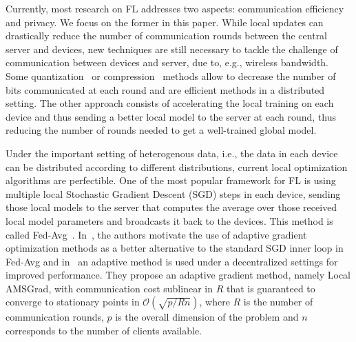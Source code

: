 \documentclass[twoside]{article}
\begin{document}
Currently, most research on FL addresses two aspects: communication efficiency and privacy.
We focus on the former in this paper.
While local updates can drastically reduce the number of communication rounds between the central server and devices, new techniques are still necessary to tackle the challenge of communication between devices and server, due to, e.g., wireless bandwidth.
Some quantization~\citep{alistarh2017qsgd, wangni2018gradient} or compression~\citep{lin2017deep} methods allow to decrease the number of bits communicated at each round and are efficient methods in a distributed setting.
The other approach consists of accelerating the local training on each device and thus sending a better local model to the server at each round, thus reducing the number of rounds needed to get a well-trained global model.

Under the important setting of heterogenous data, i.e., the data in each device can be distributed according to different distributions, current local optimization algorithms are perfectible.
One of the most popular framework for FL is using multiple local Stochastic Gradient Descent (SGD) steps in each device, sending those local models to the server that computes the average over those received local model parameters and broadcasts it back to the devices. This method is called Fed-Avg~\citep{mcmahan2017communication}.
In~\citet{chen2020toward}, the authors motivate the use of adaptive gradient optimization methods as a better alternative to the standard SGD inner loop in Fed-Avg and in~\citet{chen2021convergent} an adaptive method is used under a decentralized settings for improved performance.
 They propose an adaptive gradient method, namely Local AMSGrad, with communication cost sublinear in $R$ that is guaranteed to converge to stationary points in $\mathcal{O}(\sqrt{p/Rn})$, where $R$ is the number of communication rounds, $p$ is the overall dimension of the problem and $n$ corresponds to the number of clients available.

\vspace{0.1in}
\end{document}
